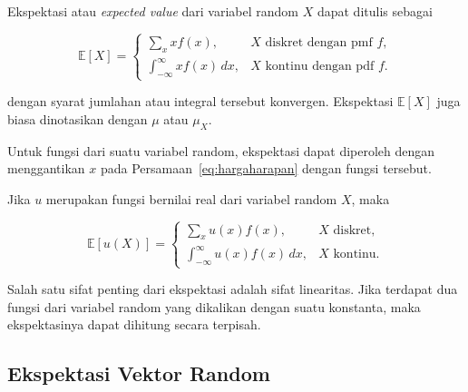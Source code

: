 \begin{definisi}

\label{def:hargaharapan}

Ekspektasi atau \textit{expected value} dari variabel random $X$ dapat ditulis
sebagai

\begin{equation}
\mathbb{E}[X]=
\begin{cases}
\displaystyle\sum_x x f(x), & X \text{ diskret dengan pmf } f,\\[1.2ex]
\displaystyle\int_{-\infty}^{\infty}x f(x)\,dx,
& X \text{ kontinu dengan pdf } f.
\end{cases}
\label{eq:hargaharapan}
\end{equation}

dengan syarat jumlahan atau integral tersebut konvergen. Ekspektasi
$\mathbb{E}[X]$ juga biasa dinotasikan dengan $\mu$ atau $\mu_X$.

\end{definisi}

Untuk fungsi dari suatu variabel random, ekspektasi dapat diperoleh dengan
menggantikan $x$ pada Persamaan~\eqref{eq:hargaharapan} dengan fungsi tersebut.

\begin{definisi}

\label{teo:ekspektasifungsi}

Jika $u$ merupakan fungsi bernilai real dari variabel random $X$, maka

\begin{equation}
\mathbb{E}[u(X)]=
\begin{cases}
\displaystyle\sum_x u(x)f(x), & X \text{ diskret},\\[1.2ex]
\displaystyle\int_{-\infty}^{\infty}u(x)f(x)\,dx,
& X \text{ kontinu}.
\end{cases}
\label{eq:ekspektasifungsi}
\end{equation}

\end{definisi}

Salah satu sifat penting dari ekspektasi adalah sifat linearitas. Jika terdapat
dua fungsi dari variabel random yang dikalikan dengan suatu konstanta, maka
ekspektasinya dapat dihitung secara terpisah.

\subsection{Ekspektasi Vektor Random}

